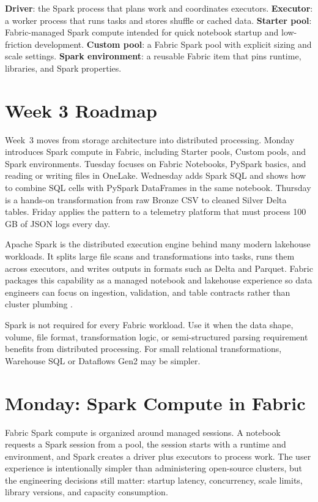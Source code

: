 \begin{keyterms}
\textbf{Driver}: the Spark process that plans work and coordinates executors. \quad
\textbf{Executor}: a worker process that runs tasks and stores shuffle or cached data. \quad
\textbf{Starter pool}: Fabric-managed Spark compute intended for quick notebook startup and low-friction development. \quad
\textbf{Custom pool}: a Fabric Spark pool with explicit sizing and scale settings. \quad
\textbf{Spark environment}: a reusable Fabric item that pins runtime, libraries, and Spark properties.
\end{keyterms}

\section{Week 3 Roadmap}
Week~3 moves from storage architecture into distributed processing. Monday introduces Spark compute in Fabric, including Starter pools, Custom pools, and Spark environments. Tuesday focuses on Fabric Notebooks, PySpark basics, and reading or writing files in OneLake. Wednesday adds Spark SQL and shows how to combine SQL cells with PySpark DataFrames in the same notebook. Thursday is a hands-on transformation from raw Bronze CSV to cleaned Silver Delta tables. Friday applies the pattern to a telemetry platform that must process 100 GB of JSON logs every day.

Apache Spark is the distributed execution engine behind many modern lakehouse workloads. It splits large file scans and transformations into tasks, runs them across executors, and writes outputs in formats such as Delta and Parquet. Fabric packages this capability as a managed notebook and lakehouse experience so data engineers can focus on ingestion, validation, and table contracts rather than cluster plumbing \cite{apacheSparkOverview,microsoftFabricSparkCompute}.

\begin{notebox}
Spark is not required for every Fabric workload. Use it when the data shape, volume, file format, transformation logic, or semi-structured parsing requirement benefits from distributed processing. For small relational transformations, Warehouse SQL or Dataflows Gen2 may be simpler.
\end{notebox}

\section{Monday: Spark Compute in Fabric}
Fabric Spark compute is organized around managed sessions. A notebook requests a Spark session from a pool, the session starts with a runtime and environment, and Spark creates a driver plus executors to process work. The user experience is intentionally simpler than administering open-source clusters, but the engineering decisions still matter: startup latency, concurrency, scale limits, library versions, and capacity consumption.

